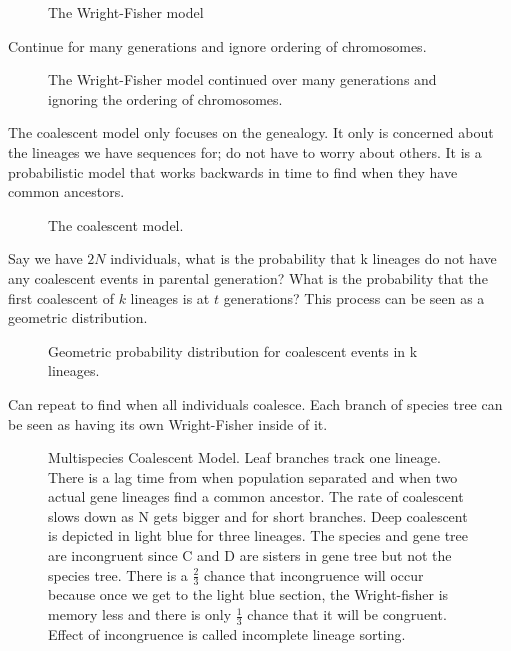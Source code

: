 \begin{figure} [ht!] 
  \centering 
  \caption{The Wright-Fisher model}
  \label{Fig13_FisherWrightModel}
\end{figure} 

\noindent Continue for many generations and ignore ordering of chromosomes.

\begin{figure} [ht!] 
  \centering 
  \caption{The Wright-Fisher model continued over many generations and
    ignoring the ordering of chromosomes.}
  \label{Fig14_FisherWrightManyGenerations}
\end{figure} 

The coalescent model only focuses on the genealogy. It only is
concerned about the lineages we have sequences for; do not have to
worry about others. It is a probabilistic model that works backwards
in time to find when they have common ancestors.

\begin{figure} [ht!] 
  \centering 
  \caption{The coalescent model.}
  \label{Fig15_CoalescentModel}
\end{figure} 

Say we have $2N$ individuals, what is the probability that k lineages
do not have any coalescent events in parental generation? What is the
probability that the first coalescent of $k$ lineages is at $t$
generations? This process can be seen as a geometric distribution.

\begin{figure} [ht!] 
  \centering 
  \caption{Geometric probability distribution for coalescent events in k lineages.}
  \label{Fig16_CoalescentProbDist}
\end{figure} 

\noindent Can repeat to find when all individuals coalesce. Each
branch of species tree can be seen as having its own Wright-Fisher
inside of it.

\begin{figure} [ht!] 
  \centering 
  \caption{Multispecies Coalescent Model. Leaf branches track one
    lineage. There is a lag time from when population separated and
    when two actual gene lineages find a common ancestor. The rate of
    coalescent slows down as N gets bigger and for short
    branches. Deep coalescent is depicted in light blue for three
    lineages. The species and gene tree are incongruent since C and D
    are sisters in gene tree but not the species tree. There is a
    $\frac{2}{3}$ chance that incongruence will occur because once we
    get to the light blue section, the Wright-fisher is memory less
    and there is only $\frac{1}{3}$ chance that it will be
    congruent. Effect of incongruence is called incomplete lineage
    sorting.}
  \label{Fig17_MultispeciesCoalescent}
\end{figure} 


